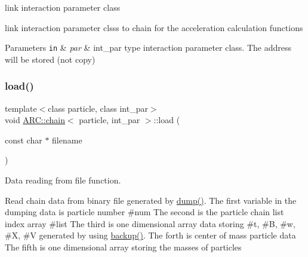 link interaction parameter class 

link interaction parameter clsss to chain for the acceleration calculation functions 
\begin{DoxyParams}[1]{Parameters}
\mbox{\tt in}  & {\em par} & int\+\_\+par type interaction parameter class. The address will be stored (not copy) \\
\hline
\end{DoxyParams}
\hypertarget{classARC_1_1chain_a921a250cfcfe7a5b8e597ddcb03730ec}{}\label{classARC_1_1chain_a921a250cfcfe7a5b8e597ddcb03730ec} 
\subsubsection{\texorpdfstring{load()}{load()}}
{\footnotesize\ttfamily template$<$class particle, class int\+\_\+par$>$ \\
void \hyperlink{classARC_1_1chain}{A\+R\+C\+::chain}$<$ particle, int\+\_\+par $>$\+::load (\begin{DoxyParamCaption}\item[{const char $\ast$}]{filename }\end{DoxyParamCaption})\hspace{0.3cm}{\ttfamily [inline]}}



Data reading from file function. 

Read chain data from binary file generated by \hyperlink{classARC_1_1chain_a6b7202e64c0a4f5d4f3f8a31f9d27e20}{dump()}. The first variable in the dumping data is particle number \#num The second is the particle chain list index array \#list The third is one dimensional array data storing \#t, \#B, \#w, \#X, \#V generated by using \hyperlink{classARC_1_1chain_ad098493cd057ac19786f5bc85f9ab25d}{backup()}. The forth is center of mass particle data The fifth is one dimensional array storing the masses of particles

